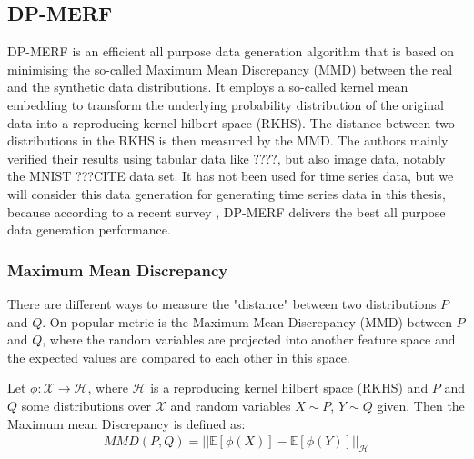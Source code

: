 \subsection{DP-MERF}

DP-MERF \parencite{dpmerf} is an efficient all purpose data generation algorithm that is based on minimising the so-called Maximum Mean Discrepancy (MMD) between the real and the synthetic data distributions. It employs a so-called kernel mean embedding to transform the underlying probability distribution of the original data into a reproducing kernel hilbert space (RKHS). The distance between two distributions in the RKHS is then measured by the MMD. The authors mainly verified their results using tabular data like ????, but also image data, notably the MNIST ???CITE data set. It has not been used for time series data, but we will consider this data generation for generating time series data in this thesis, because according to a recent survey \parencite{hu2023sok}, DP-MERF delivers the best all purpose data generation performance.

\subsubsection{Maximum Mean Discrepancy}
There are different ways to measure the "distance" between two distributions $P$ and $Q$. On popular metric is the Maximum Mean Discrepancy (MMD) between $P$ and $Q$, where the random variables are projected into another feature space and the expected values are compared to each other in this space.

\begin{definition}[MMD]
    Let $\phi: \mathcal{X} \rightarrow \mathcal{H}$, where $\mathcal{H}$ is a reproducing kernel hilbert space (RKHS) and $P$ and $Q$ some distributions over $\mathcal{X}$ and random variables $X \sim P$, $Y \sim Q$ given. Then the Maximum mean Discrepancy is defined as:
    \begin{align}
        MMD(P,Q)=|| \mathbb{E}[\phi(X)] - \mathbb{E}[\phi(Y)] ||_\mathcal{H}
    \end{align}
\end{definition}

